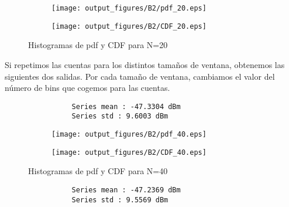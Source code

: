 \documentclass{article}
\begin{document}
            
            \begin{figure}[h]
                \centering
                \begin{subfigure}
                    \centering          \texttt{[image: output\_figures/B2/pdf\_20.eps]}
               \end{subfigure}
               \begin{subfigure}
                    \centering          \texttt{[image: output\_figures/B2/CDF\_20.eps]}
               \end{subfigure}  
             
               \caption{Histogramas de pdf y CDF para N=20}
                \label{fig:sup_rugosas}
            \end{figure}
           \par Si repetimos las cuentas para los distintos tamaños de ventana, obtenemos las siguientes dos salidas. Por cada tamaño de ventana, cambiamos el valor del número de bins que cogemos para las cuentas.
            \clearpage
        
            \begin{verbatim}
                Series mean : -47.3304 dBm
                Series std : 9.6003 dBm
            \end{verbatim}
             \begin{figure}[h]
                \centering
                \begin{subfigure}
                    \centering          \texttt{[image: output\_figures/B2/pdf\_40.eps]}
               \end{subfigure}
               \begin{subfigure}
                    \centering          \texttt{[image: output\_figures/B2/CDF\_40.eps]}
               \end{subfigure}    
               \caption{Histogramas de pdf y CDF para N=40}
                \label{fig:sup_rugosas}
            \end{figure}
            \begin{verbatim}
                Series mean : -47.2369 dBm
                Series std : 9.5569 dBm
            \end{verbatim}
\end{document}
